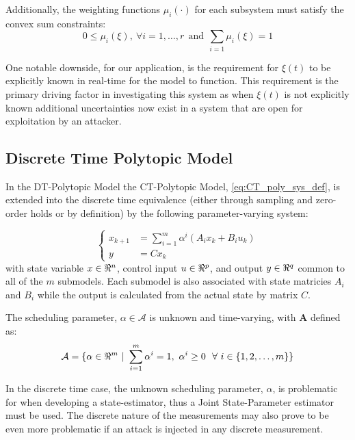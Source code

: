 \documentclass[]{ieeetran}
\begin{document}
Additionally, the weighting functions $\mu_i (\cdot)$ for each subsystem must satisfy the convex sum constraints:
\begin{equation}\label{eq:convex_sum_constraints}
	0 \leq \mu_i(\xi), \ \forall i = 1,\dots,r \ \ \text{and} \ \ \sum_{i=1} \mu_i(\xi) = 1
\end{equation}


One notable downside, for our application, is the requirement for $\xi(t)$ to be explicitly known in real-time for the model to function. This requirement is the primary driving factor in investigating this system as when $\xi(t)$ is not explicitly known additional uncertainties now exist in a system that are open for exploitation by an attacker.


\subsection{Discrete Time Polytopic Model}
In the DT-Polytopic Model the CT-Polytopic Model, \eqref{eq:CT_poly_sys_def}, is extended into the discrete time equivalence (either through sampling and zero-order holds or by definition) by the following parameter-varying system:

\begin{equation}\label{eq:DT_poly_sys_def}
	\begin{cases}
		x_{k+1} &= \sum_{i=1}^{m} \alpha^i (A_i x_k + B_i u_k)\\
		y		&= C x_k
	\end{cases}
\end{equation}
with state variable $x \in \real^n$, control input $u \in \real^p$, and output $y \in \real^q$ common to all of the $m$ submodels. Each submodel is also associated with state matricies $A_i$ and $B_i$ while the output is calculated from the actual state by matrix $C$.

The scheduling parameter, $\alpha \in \mathcal{A}$ is unknown and time-varying, with $\mathbf{A}$ defined as:
\begin{equation}\label{eq:alpha_set}
	\mathcal{A} = \{\alpha\in \real^m \ | \ \sum_{i=1}^m \alpha^i = 1, \ \alpha^i \geq 0 \ \ \forall \ i \in \{1,2,\dots,m\}\}
\end{equation}

In the discrete time case, the unknown scheduling parameter, $\alpha$, is problematic for when developing a state-estimator, thus a Joint State-Parameter estimator must be used. The discrete nature of the measurements may also prove to be even more problematic if an attack is injected in any discrete measurement.
\end{document}
